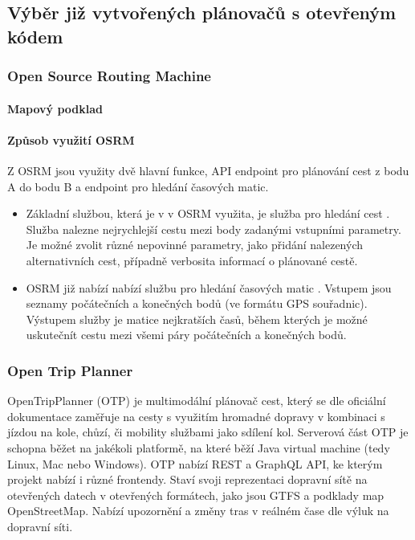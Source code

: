 \documentclass[thesis=M,czech]{FITthesis}[2019/12/23]
\theoremstyle{plain}
\theoremstyle{definition}
\begin{document}
\subsection{Výběr již vytvořených plánovačů s otevřeným kódem}

\subsubsection{Open Source Routing Machine}



\paragraph{Mapový podklad}



\paragraph{Způsob využití OSRM}

Z OSRM jsou využity dvě hlavní funkce, API endpoint pro plánování cest z bodu A do bodu B a endpoint pro hledání časových matic.




\begin{itemize}
	\item Základní službou, která je v v OSRM využita, je služba pro hledání cest \cite{osrm-route-api}.  Služba nalezne nejrychlejší cestu mezi body zadanými vstupními parametry. Je možné zvolit různé nepovinné parametry, jako přidání nalezených alternativních cest, případně verbosita informací o plánované cestě.

	\item OSRM již nabízí nabízí službu pro hledání časových matic \cite{osrm-table-api}. Vstupem jsou seznamy počátečních a konečných bodů (ve formátu GPS souřadnic). Výstupem služby je matice nejkratších časů, během kterých je možné uskutečnít cestu mezi všemi páry počátečních a konečných bodů. \label{osrm-time-matrix}

\end{itemize}


\subsubsection{Open Trip Planner}
OpenTripPlanner (OTP)\cite{otp-site} je multimodální plánovač cest, který se dle oficiální dokumentace zaměřuje na cesty s využitím hromadné dopravy v kombinaci s jízdou na kole, chůzí, či mobility službami jako sdílení kol. Serverová část OTP je schopna běžet na jakékoli platformě, na které běží Java virtual machine (tedy Linux, Mac nebo Windows). OTP nabízí REST a GraphQL API, ke kterým projekt nabízí i různé frontendy. Staví svoji reprezentaci dopravní sítě na otevřených datech v otevřených formátech, jako jsou GTFS a podklady map OpenStreetMap. Nabízí upozornění a změny tras v reálném čase dle výluk na dopravní síti.
\end{document}
